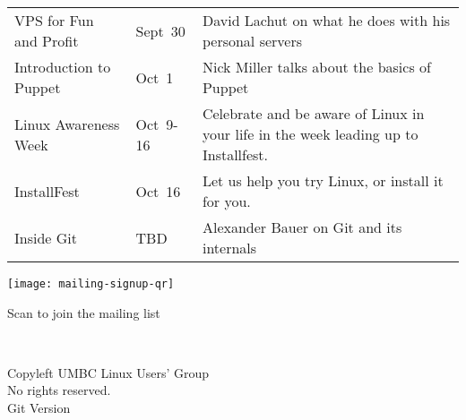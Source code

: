 \documentclass[11pt]{article}
\begin{document}
\begin{multicols*}{2}
\begin{tabular*}{\hsize}{>{\raggedright}p{0.23\hsize} >{\centering}p{0.1\hsize} p{0.55\hsize}}
    VPS for Fun and Profit & Sept~30 & David Lachut on what he does with his
    personal servers \\

    Introduction to Puppet & Oct~1 & Nick Miller talks about the basics of Puppet \\

    Linux Awareness Week & \mbox{Oct~9-16} & Celebrate and be aware of
        Linux in your life in the week leading up to Installfest. \\

    InstallFest & Oct~16 & Let us help you try Linux, or install it
        for you. \\

    Inside Git & TBD & Alexander Bauer on Git and its internals \\

\end{tabular*}

    \begin{center}
        \texttt{[image: mailing-signup-qr]}
        \vspace{-3em}
        \parbox{\hsize}{\centering \parbox{0.3\hsize}{ \centering Scan to join the mailing list }}
    \end{center}

~

\phantom{x}
\vfill
\begin{center} \tiny
    \textcopyleft{} Copyleft \the\year{} UMBC Linux Users' Group \\
    No rights reserved. \\
    Git Version 
\end{center}
\end{multicols*}
\end{document}
